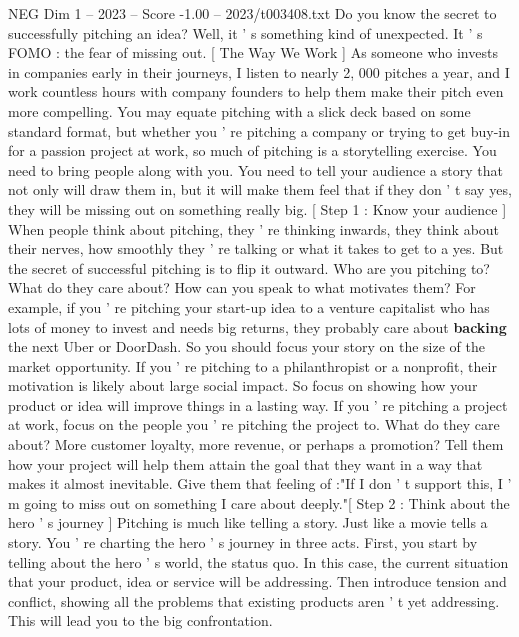 \begin{textsample}{NEG Dim 1 – 2023 – Score -1.00 – 2023/t003408.txt}  \label{ex:f1_neg_017}
Do you know the secret to successfully pitching an idea?
Well, it ' s something kind of unexpected.
It ' s FOMO : the fear of missing out. [ The Way We Work ] As someone who invests in companies early in their journeys, I listen to nearly 2, 000 pitches a year, and I work countless hours with company founders to help them make their pitch even more compelling.
You may equate pitching with a slick deck based on some standard format, but whether you ' re pitching a company or trying to get buy-in for a passion project at work, so much of pitching is a storytelling exercise.
You need to bring people along with you.
You need to tell your audience a story that not only will draw them in, but it will make them feel that if they don ' t say yes, they will be missing out on something really big. [ Step 1 : Know your audience ] When people think about pitching, they ' re thinking inwards, they think about their nerves, how smoothly they ' re talking or what it takes to get to a yes.
But the secret of successful pitching is to flip it outward.
Who are you pitching to?
What do they care about?
How can you speak to what motivates them?
For example, if you ' re pitching your start-up idea to a venture capitalist who has lots of money to invest and needs big returns, they probably care about \textbf{backing} the next Uber or DoorDash.
So you should focus your story on the size of the market opportunity.
If you ' re pitching to a philanthropist or a nonprofit, their motivation is likely about large social impact.
So focus on showing how your product or idea will improve things in a lasting way.
If you ' re pitching a project at work, focus on the people you ' re pitching the project to.
What do they care about?
More customer loyalty, more revenue, or perhaps a promotion?
Tell them how your project will help them attain the goal that they want in a way that makes it almost inevitable.
Give them that feeling of :"If I don ' t support this, I ' m going to miss out on something I care about deeply."[ Step 2 : Think about the hero ' s journey ] Pitching is much like telling a story.
Just like a movie tells a story.
You ' re charting the hero ' s journey in three acts.
First, you start by telling about the hero ' s world, the status quo.
In this case, the current situation that your product, idea or service will be addressing.
Then introduce tension and conflict, showing all the problems that existing products aren ' t yet addressing.
This will lead you to the big confrontation.

\end{textsample}
